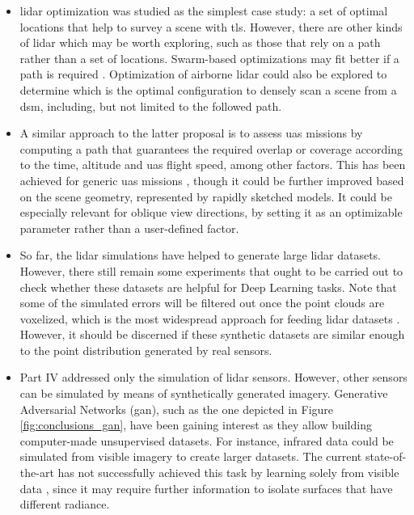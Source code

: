 \begin{itemize}
    \item \acrshort{lidar} optimization was studied as the simplest case study: a set of optimal locations that help to survey a scene with \acrshort{tls}. However, there are other kinds of \acrshort{lidar} which may be worth exploring, such as those that rely on a path rather than a set of locations. Swarm-based optimizations may fit better if a path is required \cite{roberge_fast_2018}. Optimization of airborne \acrshort{lidar} could also be explored to determine which is the optimal configuration to densely scan a scene from a \acrshort{dsm}, including, but not limited to the followed path.
    \item A similar approach to the latter proposal is to assess \acrshort{uas} missions by computing a path that guarantees the required overlap or coverage according to the time, altitude and \acrshort{uas} flight speed, among other factors. This has been achieved for generic \acrshort{uas} missions \cite{pessacg_simplifying_2022}, though it could be further improved based on the scene geometry, represented by rapidly sketched models. It could be especially relevant for oblique view directions, by setting it as an optimizable parameter rather than a user-defined factor. 
    \item So far, the \acrshort{lidar} simulations have helped to generate large \acrshort{lidar} datasets. However, there still remain some experiments that ought to be carried out to check whether these datasets are helpful for Deep Learning tasks. Note that some of the simulated errors will be filtered out once the point clouds are voxelized, which is the most widespread approach for feeding \acrshort{lidar} datasets \cite{hackel_semantic3d_2017, behley_towards_2021}. However, it should be discerned if these synthetic datasets are similar enough to the point distribution generated by real sensors. 
    \item Part IV addressed only the simulation of \acrshort{lidar} sensors. However, other sensors can be simulated by means of synthetically generated imagery. Generative Adversarial Networks (\acrshort{gan}), such as the one depicted in Figure \ref{fig:conclusions_gan}, have been gaining interest as they allow building computer-made unsupervised datasets. For instance, infrared data could be simulated from visible imagery to create larger datasets. The current state-of-the-art has not successfully achieved this task by learning solely from visible data \cite{li_multi-branch_2019, li_i-gans_2021, kniaz_thermalgan_2019, ozkanoglu_infragan_2022, yi_cycle_2023}, since it may require further information to isolate surfaces that have different radiance. 

\end{itemize}
